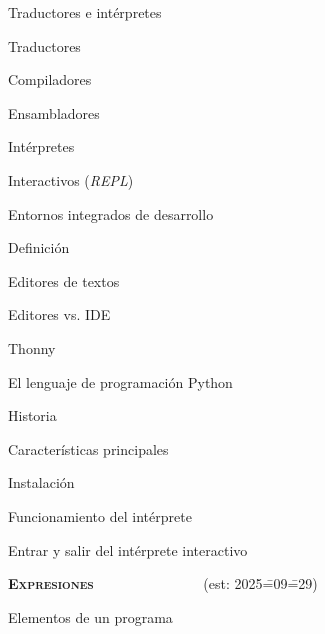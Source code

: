 \begin{longenum}
\begin{longenum}
\begin{longenum}
        \end{longenum}
        \item Traductores e intérpretes
        \begin{longenum}
            \item Traductores
            \item Compiladores
            \begin{longenum}
                \item Ensambladores
            \end{longenum}
            \item Intérpretes
            \begin{longenum}
                \item Interactivos (\textit{REPL})
            \end{longenum}
        \end{longenum}
        \item Entornos integrados de desarrollo
        \begin{longenum}
            \item Definición
            \item Editores de textos
            \item Editores vs. IDE
            \item Thonny
        \end{longenum}
        \item El lenguaje de programación Python
        \begin{longenum}
            \item Historia
            \item Características principales
            \item Instalación
            \item Funcionamiento del intérprete
            \begin{longenum}
                \item Entrar y salir del intérprete interactivo
            \end{longenum}
        \end{longenum}
    \end{longenum}
    \item \textbf{\textsc{Expresiones}} \ \ \ \ \ \ \ \ \ \ \ \ \ \ \ (est: 2025\==09\==29)
    \begin{longenum}
        \item Elementos de un programa

\end{longenum}
\end{longenum}

